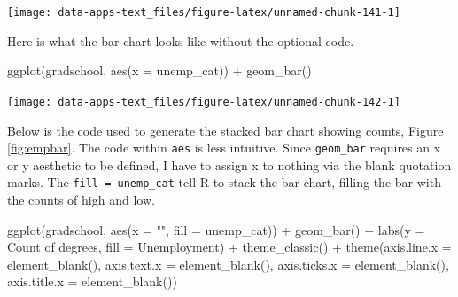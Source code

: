 \documentclass[
]{book}
\makeatletter
\newenvironment{Shaded}{\begin{snugshade}}{\end{snugshade}}
\newcommand{\AttributeTok}[1]{\textcolor[rgb]{0.61,0.61,0.61}{#1}}
\newcommand{\FunctionTok}[1]{\textcolor[rgb]{0,0,0}{#1}}
\newcommand{\NormalTok}[1]{#1}
\newcommand{\SpecialCharTok}[1]{\textcolor[rgb]{0,0,0}{#1}}
\newcommand{\StringTok}[1]{\textcolor[rgb]{0.5,0.5,0.5}{#1}}
\newenvironment{kframe}{%
\medskip{}
\setlength{\fboxsep}{.8em}
 \def\at@end@of@kframe{}%
 \ifinner\ifhmode%
  \def\at@end@of@kframe{\end{minipage}}%
  \begin{minipage}{\columnwidth}%
 \fi\fi%
 \def\FrameCommand##1{\hskip\@totalleftmargin \hskip-\fboxsep
 \colorbox{shadecolor}{##1}\hskip-\fboxsep
     \hskip-\linewidth \hskip-\@totalleftmargin \hskip\columnwidth}%
 \MakeFramed {\advance\hsize-\width
   \@totalleftmargin\z@ \linewidth\hsize
   \@setminipage}}%
 {\par\unskip\endMakeFramed%
 \at@end@of@kframe}
\renewenvironment{Shaded}{\begin{kframe}}{\end{kframe}}
\makeatother
\begin{document}
\begin{center}\texttt{[image: data-apps-text\_files/figure-latex/unnamed-chunk-141-1]} \end{center}

Here is what the bar chart looks like without the optional code.

\begin{Shaded}
\begin{Highlighting}[]
\FunctionTok{ggplot}\NormalTok{(gradschool, }\FunctionTok{aes}\NormalTok{(}\AttributeTok{x =}\NormalTok{ unemp\_cat)) }\SpecialCharTok{+}
  \FunctionTok{geom\_bar}\NormalTok{()}
\end{Highlighting}
\end{Shaded}

\begin{center}\texttt{[image: data-apps-text\_files/figure-latex/unnamed-chunk-142-1]} \end{center}

Below is the code used to generate the stacked bar chart showing counts, Figure \ref{fig:empbar}. The code within \texttt{aes} is less intuitive. Since \texttt{geom\_bar} requires an x or y aesthetic to be defined, I have to assign x to nothing via the blank quotation marks. The \texttt{fill\ =\ unemp\_cat} tell R to stack the bar chart, filling the bar with the counts of high and low.

\begin{Shaded}
\begin{Highlighting}[]
\FunctionTok{ggplot}\NormalTok{(gradschool, }\FunctionTok{aes}\NormalTok{(}\AttributeTok{x =} \StringTok{""}\NormalTok{, }\AttributeTok{fill =}\NormalTok{ unemp\_cat)) }\SpecialCharTok{+}
  \FunctionTok{geom\_bar}\NormalTok{() }\SpecialCharTok{+}
  \FunctionTok{labs}\NormalTok{(}\AttributeTok{y =} \StringTok{\textquotesingle{}Count of degrees\textquotesingle{}}\NormalTok{,}
       \AttributeTok{fill =} \StringTok{\textquotesingle{}Unemployment\textquotesingle{}}\NormalTok{) }\SpecialCharTok{+}
  \FunctionTok{theme\_classic}\NormalTok{() }\SpecialCharTok{+}
  \FunctionTok{theme}\NormalTok{(}\AttributeTok{axis.line.x =} \FunctionTok{element\_blank}\NormalTok{(),}
        \AttributeTok{axis.text.x =} \FunctionTok{element\_blank}\NormalTok{(),}
        \AttributeTok{axis.ticks.x =} \FunctionTok{element\_blank}\NormalTok{(),}
        \AttributeTok{axis.title.x =} \FunctionTok{element\_blank}\NormalTok{())}
\end{Highlighting}
\end{Shaded}
\end{document}
